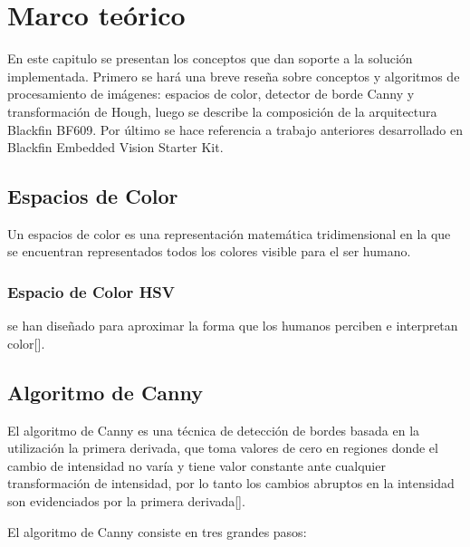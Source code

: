 \chapter{Marco teórico}
\label{ch:marco}

En este capitulo se presentan los conceptos que dan soporte a la solución implementada. Primero se hará una breve reseña sobre conceptos y algoritmos de procesamiento de imágenes: espacios de color, detector de borde Canny y transformación de Hough, luego se describe la composición de la arquitectura Blackfin BF609. Por último se hace referencia a trabajo anteriores desarrollado en Blackfin Embedded Vision Starter Kit.  

\section{Espacios de Color}

Un espacios de color es una representación matemática tridimensional en la que se encuentran representados todos los colores visible para el ser humano.

\subsection{Espacio de Color HSV}

se han diseñado para aproximar la forma que los humanos perciben e interpretan color[].

\section{Algoritmo de Canny}

El algoritmo de Canny es una técnica de detección de bordes basada en la utilización la primera derivada, que toma valores de cero en regiones donde el cambio de intensidad no varía y tiene valor constante ante cualquier transformación de intensidad, por lo tanto los cambios abruptos en la intensidad son evidenciados por la primera derivada[].

El algoritmo de Canny consiste en tres grandes pasos: 

